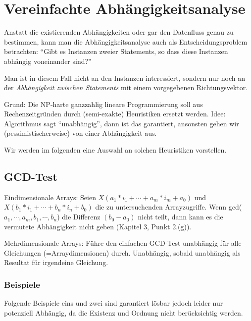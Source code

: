 \section{Vereinfachte Abhängigkeitsanalyse}

Anstatt die existierenden Abhängigkeiten oder gar den Datenfluss genau
zu bestimmen, kann man die Abhängigkeitsanalyse auch als
Entscheidungsproblem betrachten: ``Gibt es Instanzen zweier
Statements, so dass diese Instanzen abhängig voneinander sind?''

Man ist in diesem Fall nicht an den Instanzen interessiert, sondern
nur noch an der \emph{Abhängigkeit zwischen Statements} mit einem
vorgegebenen Richtungsvektor.

Grund: Die NP-harte ganzzahlig lineare Programmierung soll aus
Rechenzeitgründen durch (semi-exakte) Heuristiken ersetzt werden.
Idee: Algorithmus sagt ``unabhängig'', dann ist das garantiert,
ansonsten gehen wir (pessimistischerweise) von einer Abhängigkeit aus.

Wir werden im folgenden eine Auswahl an solchen Heuristiken
vorstellen.


\subsection{GCD-Test \cite{Ban93}}
Eindimensionale Arrays: Seien $X(a_1*i_1+\cdots+a_m*i_m+a_0)$ und
$X(b_1*i_1+\cdots+b_n*i_n+b_0)$ die zu untersuchenden Arrayzugriffe.
Wenn gcd($a_1,\cdots,a_m,b_1,\cdots,b_n$) die Differenz $(b_0-a_0)$
nicht teilt, dann kann es die vermutete Abhängigkeit nicht geben
(Kapitel 3, Punkt 2.(g)).

\smallskip 

Mehrdimensionale Arrays: Führe den einfachen GCD-Test unabhängig für
alle Gleichungen (=Arraydimensionen) durch. Unabhängig, sobald
unabhängig als Resultat für irgendeine Gleichung.

\subsubsection{Beispiele}

Folgende Beispiele eins und zwei sind garantiert lösbar jedoch leider nur potenziell Abhängig, da die Existenz und Ordnung nicht berücksichtig werden.

